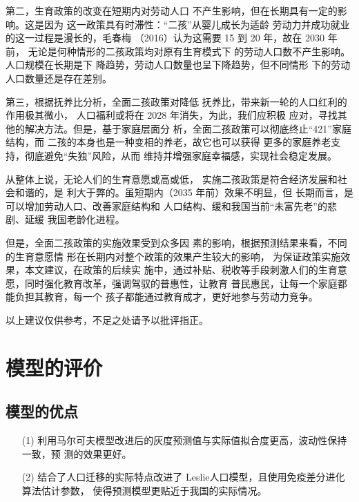 \documentclass{whutmod}
\begin{document}
        第二，生育政策的改变在短期内对劳动人口
        不产生影响，但在长期具有一定的影响。这是因为
        这一政策具有时滞性：“二孩”从婴儿成长为适龄
        劳动力并成功就业的这一过程是漫长的，毛春梅
        （2016）认为这需要 15 到 20 年，故在 2030 年前，
        无论是何种情形的二孩政策均对原有生育模式下
        的劳动人口数不产生影响。人口规模在长期是下
        降趋势，劳动人口数量也呈下降趋势，但不同情形
        下的劳动人口数量还是存在差别。
        
        第三，根据抚养比分析，全面二孩政策对降低
        抚养比，带来新一轮的人口红利的作用极其微小，
        人口福利或将在 2028 年消失，为此，我们应积极
        应对，寻找其他的解决方法。但是，基于家庭层面分
        析，全面二孩政策可以彻底终止“421”家庭结构，而
        二孩的本身也是一种变相的养老，故它也可以获得
        更多的家庭养老支持，彻底避免“失独”风险，从而
        维持并增强家庭幸福感，实现社会稳定发展。
        
        从整体上说，无论人们的生育意愿或高或低，
        实施二孩政策是符合经济发展和社会和谐的，是
        利大于弊的。虽短期内（2035 年前）效果不明显，但
        长期而言，是可以增加劳动人口、改善家庭结构和
        人口结构、缓和我国当前“未富先老”的悲剧、延缓
        我国老龄化进程。
        
        但是，全面二孩政策的实施效果受到众多因
        素的影响，根据预测结果来看，不同的生育意愿情
        形在长期内对整个政策的效果产生较大的影响，
        为保证政策实施效果，本文建议，在政策的后续实
        施中，通过补贴、税收等手段刺激人们的生育意
        愿，同时强化教育改革，强调驾驭的普惠性，让教育
        普民惠民，让每一个家庭都能负担其教育，每一个
        孩子都能通过教育成才，更好地参与劳动力竞争。

  以上建议仅供参考，不足之处请予以批评指正。
 
  	\section{模型的评价}
		\subsection{模型的优点}
			\begin{itemize}                                             
			\item [(1)]利用马尔可夫模型改进后的灰度预测值与实际值拟合度更高，波动性保持一致，预 测的效果更好。 
			\item [(2)] 结合了人口迁移的实际特点改进了 Leslie人口模型，且使用免疫差分进化算法估计参数， 使得预测模型更贴近于我国的实际情况。
			\end{itemize}
\end{document}
